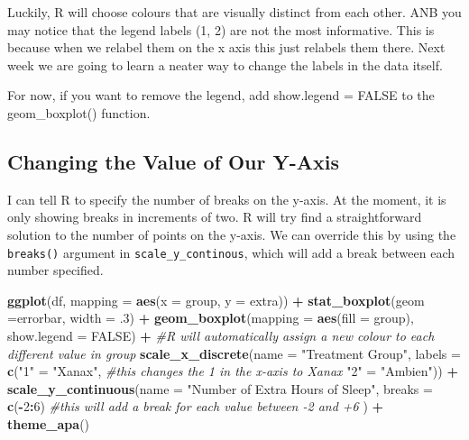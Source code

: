 \documentclass[
]{book}
\newenvironment{Shaded}{\begin{snugshade}}{\end{snugshade}}
\newcommand{\AttributeTok}[1]{\textcolor[rgb]{0.13,0.29,0.53}{#1}}
\newcommand{\CommentTok}[1]{\textcolor[rgb]{0.56,0.35,0.01}{\textit{#1}}}
\newcommand{\ConstantTok}[1]{\textcolor[rgb]{0.56,0.35,0.01}{#1}}
\newcommand{\DecValTok}[1]{\textcolor[rgb]{0.00,0.00,0.81}{#1}}
\newcommand{\FunctionTok}[1]{\textcolor[rgb]{0.13,0.29,0.53}{\textbf{#1}}}
\newcommand{\NormalTok}[1]{#1}
\newcommand{\OtherTok}[1]{\textcolor[rgb]{0.56,0.35,0.01}{#1}}
\newcommand{\SpecialCharTok}[1]{\textcolor[rgb]{0.81,0.36,0.00}{\textbf{#1}}}
\newcommand{\StringTok}[1]{\textcolor[rgb]{0.31,0.60,0.02}{#1}}
\begin{document}
Luckily, R will choose colours that are visually distinct from each other. ANB you may notice that the legend labels (1, 2) are not the most informative. This is because when we relabel them on the x axis this just relabels them there. Next week we are going to learn a neater way to change the labels in the data itself.

For now, if you want to remove the legend, add show.legend = FALSE to the geom\_boxplot() function.

\subsection{Changing the Value of Our Y-Axis}\label{changing-the-value-of-our-y-axis}

I can tell R to specify the number of breaks on the y-axis. At the moment, it is only showing breaks in increments of two. R will try find a straightforward solution to the number of points on the y-axis. We can override this by using the \texttt{breaks()} argument in \texttt{scale\_y\_continous}, which will add a break between each number specified.

\begin{Shaded}
\begin{Highlighting}[]
\FunctionTok{ggplot}\NormalTok{(df, }\AttributeTok{mapping =} \FunctionTok{aes}\NormalTok{(}\AttributeTok{x =}\NormalTok{ group, }\AttributeTok{y =}\NormalTok{ extra)) }\SpecialCharTok{+} 
  \FunctionTok{stat\_boxplot}\NormalTok{(}\AttributeTok{geom =}\StringTok{\textquotesingle{}errorbar\textquotesingle{}}\NormalTok{, }\AttributeTok{width =}\NormalTok{ .}\DecValTok{3}\NormalTok{) }\SpecialCharTok{+}
  \FunctionTok{geom\_boxplot}\NormalTok{(}\AttributeTok{mapping =} \FunctionTok{aes}\NormalTok{(}\AttributeTok{fill =}\NormalTok{ group), }\AttributeTok{show.legend =} \ConstantTok{FALSE}\NormalTok{) }\SpecialCharTok{+} \CommentTok{\#R will automatically assign a new colour to each different value in group}
 \FunctionTok{scale\_x\_discrete}\NormalTok{(}\AttributeTok{name =} \StringTok{"Treatment Group"}\NormalTok{,}
                   \AttributeTok{labels =} \FunctionTok{c}\NormalTok{(}\StringTok{"1"}  \OtherTok{=} \StringTok{"Xanax"}\NormalTok{, }\CommentTok{\#this changes the 1 in the x{-}axis to Xanax}
                              \StringTok{"2"} \OtherTok{=} \StringTok{"Ambien"}\NormalTok{)) }\SpecialCharTok{+}
  \FunctionTok{scale\_y\_continuous}\NormalTok{(}\AttributeTok{name =} \StringTok{"Number of Extra Hours of Sleep"}\NormalTok{, }
                     \AttributeTok{breaks =} \FunctionTok{c}\NormalTok{(}\SpecialCharTok{{-}}\DecValTok{2}\SpecialCharTok{:}\DecValTok{6}\NormalTok{) }\CommentTok{\#this will add a break for each value between {-}2 and +6}
\NormalTok{                  ) }\SpecialCharTok{+}
  \FunctionTok{theme\_apa}\NormalTok{()}
\end{Highlighting}
\end{Shaded}
\end{document}
